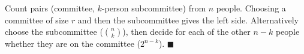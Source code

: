 Count pairs (committee, $k$-person subcommittee) from $n$ people. Choosing a committee of size $r$ and then the subcommittee gives the left side. Alternatively choose the subcommittee ($\binom nk$), then decide for each of the other $n-k$ people whether they are on the committee ($2^{n-k}$). $\blacksquare$
